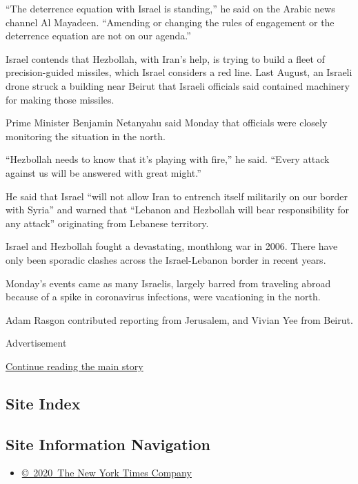 ``The deterrence equation with Israel is standing,'' he said on the
Arabic news channel Al Mayadeen. ``Amending or changing the rules of
engagement or the deterrence equation are not on our agenda.''

Israel contends that Hezbollah, with Iran's help, is trying to build a
fleet of precision-guided missiles, which Israel considers a red line.
Last August, an Israeli drone struck a building near Beirut that Israeli
officials said contained machinery for making those missiles.

Prime Minister Benjamin Netanyahu said Monday that officials were
closely monitoring the situation in the north.

``Hezbollah needs to know that it's playing with fire,'' he said.
``Every attack against us will be answered with great might.''

He said that Israel ``will not allow Iran to entrench itself militarily
on our border with Syria'' and warned that ``Lebanon and Hezbollah will
bear responsibility for any attack'' originating from Lebanese
territory.

Israel and Hezbollah fought a devastating, monthlong war in 2006. There
have only been sporadic clashes across the Israel-Lebanon border in
recent years.

Monday's events came as many Israelis, largely barred from traveling
abroad because of a spike in coronavirus infections, were vacationing in
the north.

Adam Rasgon contributed reporting from Jerusalem, and Vivian Yee from
Beirut.

Advertisement

\protect\hyperlink{after-bottom}{Continue reading the main story}

\hypertarget{site-index}{%
\subsection{Site Index}\label{site-index}}

\hypertarget{site-information-navigation}{%
\subsection{Site Information
Navigation}\label{site-information-navigation}}

\begin{itemize}
\tightlist
\item
  \href{https://help.nytimes3xbfgragh.onion/hc/en-us/articles/115014792127-Copyright-notice}{©~2020~The
  New York Times Company}
\end{itemize}

